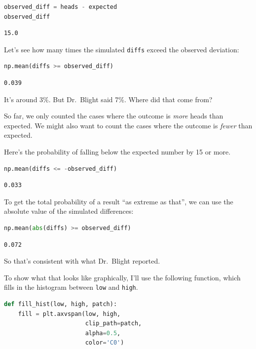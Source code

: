 \begin{lstlisting}[language=Python]
observed_diff = heads - expected
observed_diff
\end{lstlisting}

\begin{lstlisting}[]
15.0
\end{lstlisting}

Let's see how many times the simulated \passthrough{\lstinline!diffs!}
exceed the observed deviation:

\begin{lstlisting}[language=Python]
np.mean(diffs >= observed_diff)
\end{lstlisting}

\begin{lstlisting}[]
0.039
\end{lstlisting}

It's around 3\%. But Dr.~Blight said 7\%. Where did that come from?

So far, we only counted the cases where the outcome is \emph{more} heads
than expected. We might also want to count the cases where the outcome
is \emph{fewer} than expected.

Here's the probability of falling below the expected number by 15 or
more.

\begin{lstlisting}[language=Python]
np.mean(diffs <= -observed_diff)
\end{lstlisting}

\begin{lstlisting}[]
0.033
\end{lstlisting}

To get the total probability of a result ``as extreme as that'', we can
use the absolute value of the simulated differences:

\begin{lstlisting}[language=Python]
np.mean(abs(diffs) >= observed_diff)
\end{lstlisting}

\begin{lstlisting}[]
0.072
\end{lstlisting}

So that's consistent with what Dr.~Blight reported.

To show what that looks like graphically, I'll use the following
function, which fills in the histogram between
\passthrough{\lstinline!low!} and \passthrough{\lstinline!high!}.

\begin{lstlisting}[language=Python]
def fill_hist(low, high, patch):
    fill = plt.axvspan(low, high, 
                       clip_path=patch,
                       alpha=0.5, 
                       color='C0')
\end{lstlisting}

